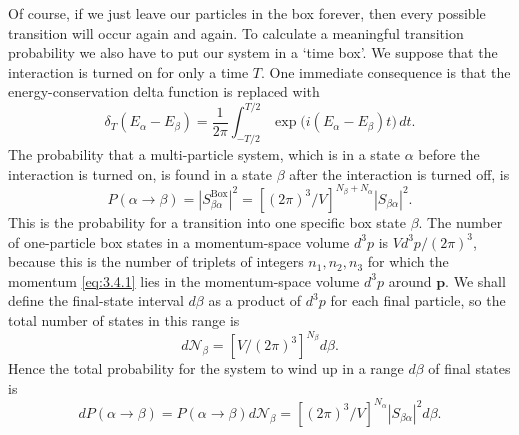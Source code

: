 Of course, if we just leave our particles in the box forever, then every possible transition
will occur again and again. To calculate a meaningful transition probability we also have to
put our system in a `time box'. We suppose that the interaction is turned on for only a time
$T$. One immediate consequence is that the energy-conservation delta function is replaced
with
\begin{equation}
 \delta_T(E_\alpha-E_\beta)=\frac{1}{2\pi}\int_{-T/2}^{T/2}
 \exp\bigl(i(E_\alpha-E_\beta)t\bigr)\,dt.
 \tag{3.4.6}\label{eq:3.4.6}
\end{equation}
The probability that a multi-particle system, which is in a state $\alpha$ before the
interaction is turned on, is found in a state $\beta$ after the interaction is turned off, is
\begin{equation}
 P(\alpha\to\beta)=|S^{\mathrm{Box}}_{\beta\alpha}|^2
 =\left[(2\pi)^3/V\right]^{N_\beta+N_\alpha}|S_{\beta\alpha}|^2.
 \tag{3.4.7}\label{eq:3.4.7}
\end{equation}
This is the probability for a transition into one specific box state $\beta$. The number of
one-particle box states in a momentum-space volume $d^3p$ is $Vd^3p/(2\pi)^3$, because this
is the number of triplets of integers $n_1,n_2,n_3$ for which the momentum \eqref{eq:3.4.1} lies in the
momentum-space volume $d^3p$ around $\mathbf{p}$. We shall define the final-state interval
$d\beta$ as a product of $d^3p$ for each final particle, so the total number of states in this
range is
\begin{equation}
 d\mathcal{N}_\beta=\left[V/(2\pi)^3\right]^{N_\beta}d\beta.
 \tag{3.4.8}\label{eq:3.4.8}
\end{equation}
Hence the total probability for the system to wind up in a range $d\beta$ of final states is
\begin{equation}
 dP(\alpha\to\beta)=P(\alpha\to\beta)d\mathcal{N}_\beta
 =\left[(2\pi)^3/V\right]^{N_\alpha}|S_{\beta\alpha}|^2d\beta.
 \tag{3.4.9}\label{eq:3.4.9}
\end{equation}

